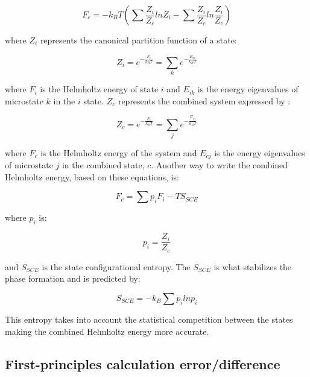 \begin{equation}
\label{eq: combinedhelmholtz}
F_{c} = - k_{B} T \left( \sum \frac{Z_{i}}{Z_{c}} lnZ_{i} - \sum \frac{Z_{i}}{Z_{c}} ln \frac{Z_{i}}{Z_{c}}  \right) 
\end{equation}

\noindent where $Z_{i}$ represents the canonical partition function of a state:

\begin{equation}
\label{eq: zi}
Z_{i} = e^{- \frac{F_{i}}{k_{B}T}} = \sum_{k} e^{- \frac{E_{ik}}{k_{B}T}}
\end{equation}

\noindent where $F_{i}$ is the Helmholtz energy of state $i$ and $E_{ik}$ is the energy eigenvalues of microstate $k$ in the $i$ state. $Z_{c}$ represents the combined system expressed by \cite{Liu2017}:

\begin{equation}
\label{eq: zc}
Z_{c} = e^{-\frac{F_{c}}{k_{B}T}} = \sum_{j} e^{- \frac{E_{cj}}{k_{B}T}} 
\end{equation}

\noindent where $F_{c}$ is the Helmholtz energy of the system and $E_{cj}$ is the energy eigenvalues of microstate $j$ in the combined state, $c$. Another way to write the combined Helmholtz energy, based on these equations, is:

\begin{equation}
\label{eq: combinedhelmholtz2}
F_{c} = \sum p_{i} F_{i} - TS_{SCE}
\end{equation}

\noindent where $p_{i}$ is:

\begin{equation}
\label{pi}
p_{i} = \frac{Z_{i}}{Z_{c}}
\end{equation}

\noindent and $S_{SCE}$ is the state configurational entropy. The $S_{SCE}$ is what stabilizes the phase formation and is predicted by:

\begin{equation}
\label{SSCE}
S_{SCE} = -k_{B} \sum p_{i} lnp_{i}
\end{equation}

\noindent This entropy takes into account the statistical competition between the states making the combined Helmholtz energy more accurate.

\subsection{First-principles calculation error/difference}

